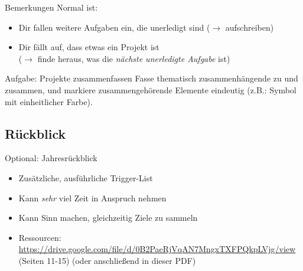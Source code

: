 \begin{frame}[c]{Bemerkungen}
    \large
    Normal ist:
    \begin{itemize}[<+(1)->]
        \item Dir fallen weitere Aufgaben ein, die unerledigt sind ($\rightarrow$ aufschreiben)
        \item Dir fällt auf, dass etwas ein Projekt ist \\ ($\rightarrow$ finde heraus, was die {\em nächste unerledigte Aufgabe} ist)
    \end{itemize}
\end{frame}


\begin{frame}[c]
    \large
    \begin{block}{Aufgabe: Projekte zusammenfassen}
    Fasse thematisch zusammenhängende  zu  und
     zusammen, und markiere zusammengehörende Elemente
    eindeutig (z.B.: Symbol mit einheitlicher Farbe).
    \end{block}
\end{frame}

\fpause


\subsection{Rückblick}

\begin{frame}[c]{Optional: Jahresrückblick}
    \begin{itemize}[<+(1)->]
        \item Zusätzliche, ausführliche Trigger-List
        \item Kann {\em sehr} viel Zeit in Anspruch nehmen
        \item Kann Sinn machen, gleichzeitig Ziele zu sammeln
        \item Ressourcen: \url{https://drive.google.com/file/d/0B2PaeRjVqAN7MngxTXFPQkpLVjg/view} \cite{8760-hours} (Seiten 11-15) (oder anschließend in dieser PDF)
    \end{itemize}
\end{frame}

% 
% 
{
    \addtocounter{framenumber}{5}
    
}

\fpause
